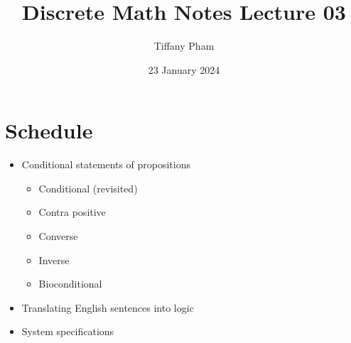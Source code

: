 \documentclass{article}
\title{Discrete Math Notes Lecture 03}
\author{Tiffany Pham}
\date{23 January 2024}
\begin{document}
\maketitle

\section{Schedule}
\begin{itemize}
    \item Conditional statements of propositions
    \begin{itemize}
        \item Conditional (revisited)
        \item Contra positive
        \item Converse
        \item Inverse
        \item Bioconditional
    \end{itemize}
    \item Translating English sentences into logic
    \item System specifications
\end{itemize}
\end{document}

